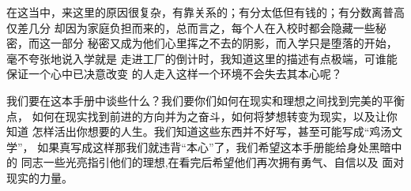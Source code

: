 \documentclass{article}
\begin{document}
在这当中，来这里的原因很复杂，有靠关系的；有分太低但有钱的；有分数离普高仅差几分
却因为家庭负担而来的，总而言之，每个人在入校时都会隐藏一些秘密，而这一部分
秘密又成为他们心里挥之不去的阴影，而入学只是堕落的开始，毫不夸张地说入学就是
走进工厂的倒计时，我知道这里的描述有点极端，可谁能保证一个心中已决意改变
的人走入这样一个环境不会失去其本心呢？

我们要在这本手册中谈些什么？我们要你们如何在现实和理想之间找到完美的平衡点，
如何在现实找到前进的方向并为之奋斗，如何将梦想转变为现实，以及让你知道
怎样活出你想要的人生。我们知道这些东西并不好写，甚至可能写成“鸡汤文学”，
如果真写成这样那我们就违背“本心”了，我们希望这本手册能给身处黑暗中的
同志一些光亮指引他们的理想,在看完后希望他们再次拥有勇气、自信以及
面对现实的力量。

\newpage
\tableofcontents
{}


\end{document}
